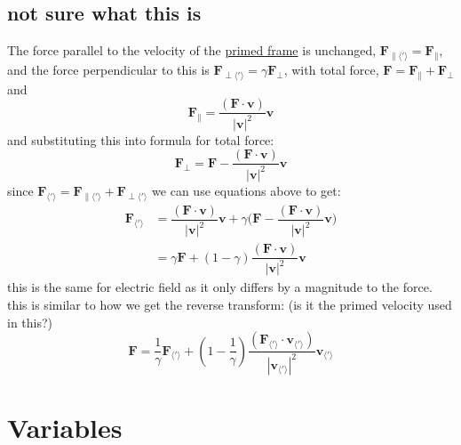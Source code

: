 \subsection{not sure what this is}
The force parallel to the velocity of the \hyperlink{def-Primed-Frame}{primed frame} is unchanged, $\mathbf{F}_{\parallel \langle ' \rangle} =\mathbf{F}_{\parallel}$, and the force perpendicular to this is $\mathbf{F}_{\perp \langle ' \rangle} =\gamma \mathbf{F}_{\perp}$, with total force, $\mathbf{F}=\mathbf{F}_{\parallel}+\mathbf{F}_{\perp}$ and
\begin{equation}%
	\mathbf{F}_{\parallel} = \dfrac{(\mathbf{F}\cdot\mathbf{v})}{|\mathbf{v}|^2}\mathbf{v}
\end{equation}%
and substituting this into formula for total force:
\begin{equation}%
	\mathbf{F}_{\perp} = \mathbf{F}-\dfrac{(\mathbf{F}\cdot\mathbf{v})}{|\mathbf{v}|^2}\mathbf{v}
\end{equation}%
since $\mathbf{F}_{\langle ' \rangle} =\mathbf{F}_{\parallel \langle ' \rangle} +\mathbf{F}_{\perp\langle ' \rangle}$ we can use equations above to get:
\begin{equation}%
	\begin{split}
		\mathbf{F}_{\langle ' \rangle} & = \dfrac{(\mathbf{F}\cdot\mathbf{v})}{|\mathbf{v}|^2}\mathbf{v} + \gamma\bigg(\mathbf{F}-\dfrac{(\mathbf{F}\cdot\mathbf{v})}{|\mathbf{v}|^2}\mathbf{v}\bigg) \\
		                               & = \gamma\mathbf{F} + (1-\gamma)\dfrac{(\mathbf{F}\cdot\mathbf{v})}{|\mathbf{v}|^2}\mathbf{v}
	\end{split}
\end{equation}%
this is the same for electric field as it only differs by a magnitude to the force.\newline
this is similar to how we get the reverse transform: (is it the primed velocity used in this?)
\begin{equation}%
	\mathbf{F} = \dfrac{1}{\gamma}\mathbf{F}_{\langle ' \rangle}  + (1-\dfrac{1}{\gamma})\dfrac{(\mathbf{F}_{\langle ' \rangle} \cdot\mathbf{v}_{\langle ' \rangle} )}{|\mathbf{v}_{\langle ' \rangle} |^2}\mathbf{v}_{\langle ' \rangle}
\end{equation}%

\section{Variables}

